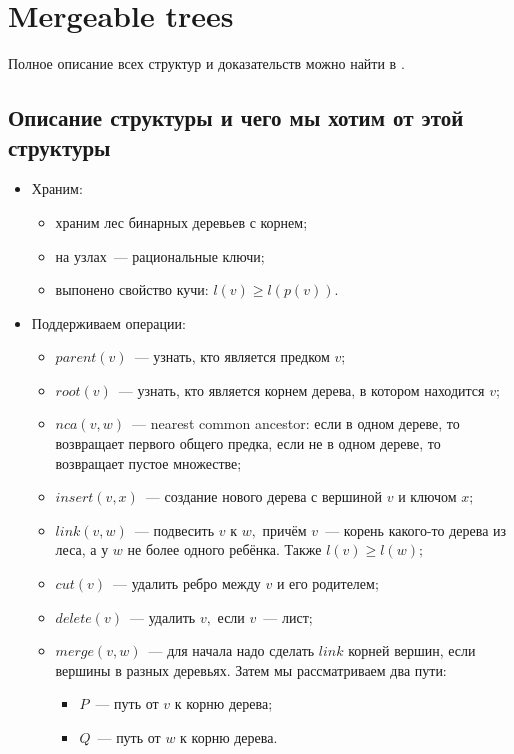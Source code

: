 
\section{Mergeable trees}
Полное описание всех структур и доказательств можно найти в \cite{georgiadis2011data}.
\subsection{Описание структуры и чего мы хотим от этой структуры}
\begin{itemize}
    \item Храним:
    \begin{itemize}
        \item храним лес бинарных деревьев с корнем;
        \item на узлах~--- рациональные ключи;
        \item выпонено свойство кучи: $l(v)\geqslant l(p(v)).$
    \end{itemize}
    \item Поддерживаем операции:
    \begin{itemize}
        \item $parent(v)$~--- узнать, кто является предком $v$;
        \item $root(v)$~--- узнать, кто является корнем дерева, в котором находится $v$;
        \item  $nca(v, w)$~--- nearest common ancestor: если в одном дереве, то возвращает первого общего предка, если не в одном дереве, то возвращает пустое множестве;
        \item $insert(v, x)$~--- создание нового дерева с вершиной $v$ и ключом $x;$
        \item $link(v, w)$~--- подвесить $v$ к $w,$ причём $v$~--- корень какого-то дерева из леса, а у $w$ не более одного ребёнка. Также $l(v)\geqslant l(w);$
        \item $cut(v)$~--- удалить ребро между $v$ и его родителем;
       \item $delete(v)$~--- удалить $v,$ если $v$~--- лист;
       \item $merge(v, w)$~--- для начала надо сделать $link$ корней вершин, если вершины в разных деревьях. Затем мы рассматриваем два пути:
       \begin{itemize}
           \item $P$~--- путь от $v$ к корню дерева;
           \item $Q$~--- путь от $w$ к корню дерева.
       \end{itemize}

\end{itemize}
\end{itemize}
